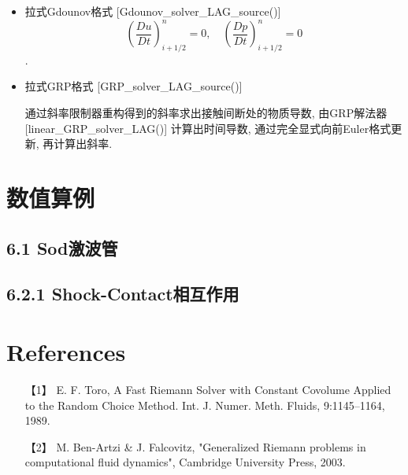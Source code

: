 \documentclass[CJK]{ctexart}
\begin{document}
\begin{itemize}
\item 拉式Gdounov格式 [Gdounov\_solver\_LAG\_source()]
$$
\left(\frac{D u}{D t}\right)_{i+1/2}^{n}=0, \quad \left(\frac{D p}{D t}\right)_{i+1/2}^{n}=0
$$. 

\item 拉式GRP格式 [GRP\_solver\_LAG\_source()]

通过斜率限制器重构得到的斜率求出接触间断处的物质导数, 由GRP解法器 [linear\_GRP\_solver\_LAG()] 计算出时间导数, 通过完全显式向前Euler格式更新, 再计算出斜率.
\end{itemize}

\section{数值算例}

\subsection*{6.1 Sod激波管}

\subsection*{6.2.1 Shock-Contact相互作用}

\section*{References}

\begin{itemize}
\item[【1】] E. F. Toro, A Fast Riemann Solver with Constant Covolume Applied to the
Random Choice Method. Int. J. Numer. Meth. Fluids, 9:1145–1164, 1989.

\item[【2】] M. Ben-Artzi \& J. Falcovitz, "Generalized Riemann problems in computational fluid dynamics", Cambridge University Press, 2003.
\end{itemize}
\end{document}
